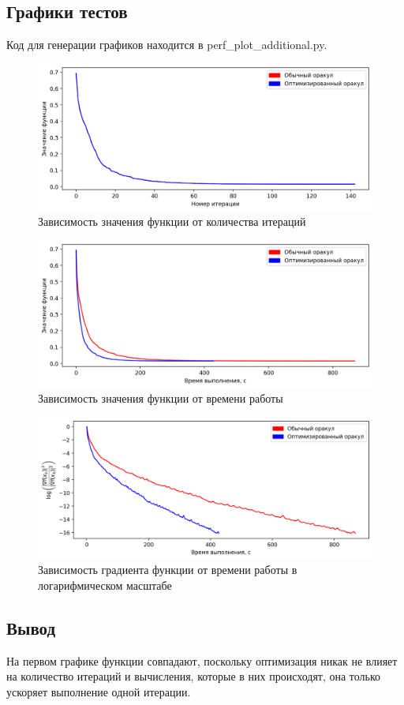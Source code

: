 \documentclass[notitlepage]{article}
\begin{document}
\subsection*{Графики тестов}
Код для генерации графиков находится в perf\_plot\_additional.py.
\begin{figure}[ht]
  \centering
  \includegraphics[width=.8\linewidth, keepaspectratio]{plots/optimized_func_number.png}
  \caption{Зависимость значения функции от количества итераций}
\end{figure}
\begin{figure}[ht]
  \centering
  \includegraphics[width=.8\linewidth, keepaspectratio]{plots/optimized_func_time.png}
  \caption{Зависимость значения функции от времени работы}
\end{figure}
\begin{figure}[ht]
  \centering
  \includegraphics[width=.8\linewidth, keepaspectratio]{plots/optimized_grad_time.png}
  \caption{Зависимость градиента функции от времени работы в логарифмическом масштабе}
\end{figure}
\FloatBarrier
\subsection*{Вывод}
На первом графике функции совпадают, поскольку оптимизация никак не влияет на количество итераций и вычисления, которые в них происходят,
она только ускоряет выполнение одной итерации.
\end{document}
